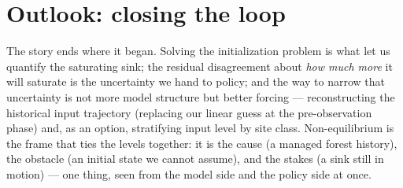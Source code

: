 \documentclass[11pt]{article}
\begin{document}
\section{Outlook: closing the loop}

The story ends where it began. Solving the initialization problem is what let us quantify the saturating sink;
the residual disagreement about \emph{how much more} it will saturate is the uncertainty we hand to policy; and the
way to narrow that uncertainty is not more model structure but better forcing --- reconstructing the historical
input trajectory (replacing our linear guess at the pre-observation phase) and, as an option, stratifying input
level by site class. Non-equilibrium is the frame that ties the levels together: it is the cause (a managed forest
history), the obstacle (an initial state we cannot assume), and the stakes (a sink still in motion) --- one thing,
seen from the model side and the policy side at once.
\end{document}

